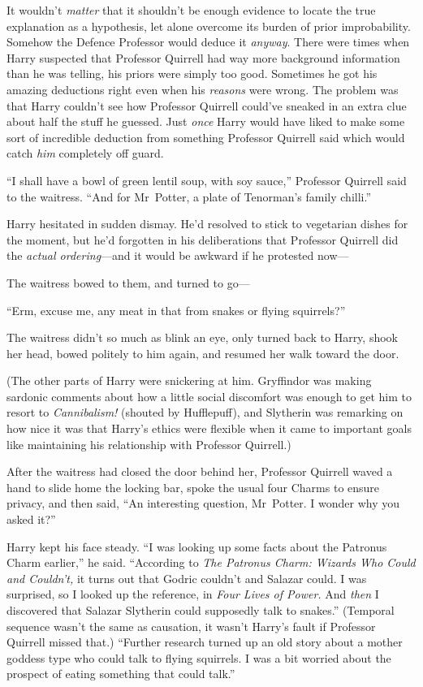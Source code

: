 It wouldn’t \emph{matter} that it shouldn’t be enough evidence to locate the true explanation as a hypothesis, let alone overcome its burden of prior improbability. Somehow the Defence Professor would deduce it \emph{anyway}. There were times when Harry suspected that Professor Quirrell had way more background information than he was telling, his priors were simply too good. Sometimes he got his amazing deductions right even when his \emph{reasons} were wrong. The problem was that Harry couldn’t see how Professor Quirrell could’ve sneaked in an extra clue about half the stuff he guessed. Just \emph{once} Harry would have liked to make some sort of incredible deduction from something Professor Quirrell said which would catch \emph{him} completely off guard.

\later

“I shall have a bowl of green lentil soup, with soy sauce,” Professor Quirrell said to the waitress.
“And for Mr~Potter, a plate of Tenorman’s family chilli.”

Harry hesitated in sudden dismay. He’d resolved to stick to vegetarian dishes for the moment, but he’d forgotten in his deliberations that Professor Quirrell did the \emph{actual ordering}—and it would be awkward if he protested now—

The waitress bowed to them, and turned to go—

“Erm, excuse me, any meat in that from snakes or flying squirrels?”

The waitress didn’t so much as blink an eye, only turned back to Harry, shook her head, bowed politely to him again, and resumed her walk toward the door.

(The other parts of Harry were snickering at him. Gryffindor was making sardonic comments about how a little social discomfort was enough to get him to resort to \emph{Cannibalism!} (shouted by Hufflepuff), and Slytherin was remarking on how nice it was that Harry’s ethics were flexible when it came to important goals like maintaining his relationship with Professor Quirrell.)

After the waitress had closed the door behind her, Professor Quirrell waved a hand to slide home the locking bar, spoke the usual four Charms to ensure privacy, and then said,
“An interesting question, Mr~Potter. I wonder why you asked it?”

Harry kept his face steady.
“I was looking up some facts about the Patronus Charm earlier,” he said.
“According to \emph{The Patronus Charm: Wizards Who Could and Couldn’t,} it turns out that Godric couldn’t and Salazar could. I was surprised, so I looked up the reference, in \emph{Four Lives of Power.} And \emph{then} I discovered that Salazar Slytherin could supposedly talk to snakes.” (Temporal sequence wasn’t the same as causation, it wasn’t Harry’s fault if Professor Quirrell missed that.)
“Further research turned up an old story about a mother goddess type who could talk to flying squirrels. I was a bit worried about the prospect of eating something that could talk.”

